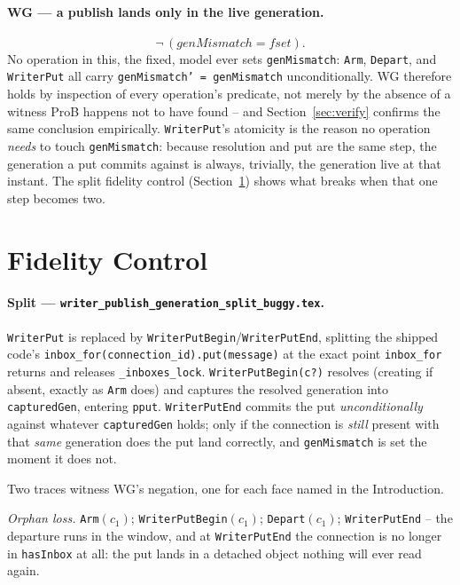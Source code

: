 \documentclass[a4paper,10pt,fleqn]{article}
\begin{document}
\paragraph{WG --- a publish lands only in the live generation.}
\[
  \lnot\, (genMismatch = fset).
\]
No operation in this, the fixed, model ever sets \texttt{genMismatch}:
\texttt{Arm}, \texttt{Depart}, and \texttt{WriterPut} all carry
\texttt{genMismatch' = genMismatch} unconditionally. WG therefore holds by
inspection of every operation's predicate, not merely by the absence of a
witness ProB happens not to have found -- and Section~\ref{sec:verify}
confirms the same conclusion empirically. \texttt{WriterPut}'s atomicity is
the reason no operation \emph{needs} to touch \texttt{genMismatch}: because
resolution and put are the same step, the generation a put commits against
is always, trivially, the generation live at that instant. The split
fidelity control (Section~\ref{sec:fidelity}) shows what breaks when that
one step becomes two.

\section{Fidelity Control}
\label{sec:fidelity}

\paragraph{Split --- \texttt{writer\_publish\_generation\_split\_buggy.tex}.}
\texttt{WriterPut} is replaced by \texttt{WriterPutBegin}/\texttt{WriterPutEnd},
splitting the shipped code's \texttt{inbox\_for(connection\_id).put(message)}
at the exact point \texttt{inbox\_for} returns and releases
\texttt{\_inboxes\_lock}. \texttt{WriterPutBegin(c?)} resolves (creating if
absent, exactly as \texttt{Arm} does) and captures the resolved generation
into \texttt{capturedGen}, entering \texttt{pput}. \texttt{WriterPutEnd}
commits the put \emph{unconditionally} against whatever \texttt{capturedGen}
holds; only if the connection is \emph{still} present with that \emph{same}
generation does the put land correctly, and \texttt{genMismatch} is set the
moment it does not.

Two traces witness WG's negation, one for each face named in the
Introduction.

\emph{Orphan loss.} \texttt{Arm}$(c_1)$;
\texttt{WriterPutBegin}$(c_1)$; \texttt{Depart}$(c_1)$;
\texttt{WriterPutEnd} -- the departure runs in the window, and at
\texttt{WriterPutEnd} the connection is no longer in \texttt{hasInbox} at
all: the put lands in a detached object nothing will ever read again.
\end{document}
